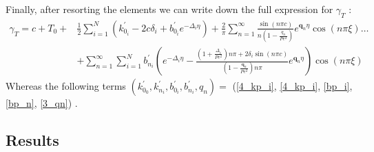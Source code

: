 \documentclass[12pt]{article}
\numberwithin{equation}{section}
\begin{document}
\begin{flushleft}
Finally, after resorting the elements we can write down the full expression for $\gamma_{T}$ :
\begin{align}
\gamma_{T}=c+T_{0}+& \frac{1}{2} \sum_{i=1}^{N}\left(k_{0_{i}}^{\prime}-2 c \delta_{i}+b_{0_{i}}^{\prime} e^{-\Delta_{i} \eta}\right)+\frac{2}{\pi} \sum_{n=1}^{\infty} \frac{\sin (n \pi c)}{n\left(1-\frac{q_{n}}{P e^{2}}\right)} e^{\textbf{q}_n \eta} \cos (n \pi \xi) \ldots \\
&+\sum_{n=1}^{\infty} \sum_{i=1}^{N} b_{n_{i}}^{\prime}\left(e^{-\Delta_{i} \eta}-\frac{\left(1+\frac{\Delta_{i}}{Pe^{2}}\right) n \pi+2 \delta_{i} \sin (n \pi c)}{\left(1-\frac{\textbf{q}_n}{Pe^{2}}\right) n \pi} e^{\textbf{q}_n \eta}\right) \cos (n \pi \xi)
\end{align}
Whereas the following terms $\left(k_{0_{0}}^{\prime}, k_{n_{i}}^{\prime}, b_{0_{i}}^{\prime}, b_{n_{i}}^{\prime}, q_{n}\right)=$ (\ref{4_kp_i}, \ref{4_kp_i}, \ref{bp_i},  \ref{bp_n}, \ref{3_qn}) .


\newpage

\subsection{Results}


\end{flushleft}
\end{document}
